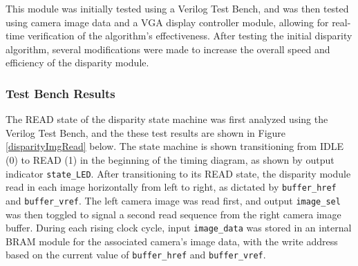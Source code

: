 \par
This module was initially tested using a Verilog Test Bench, and was then tested using camera image data and a VGA display controller module, allowing for real-time verification of the algorithm's effectiveness. After testing the initial disparity algorithm, several modifications were made to increase the overall speed and efficiency of the disparity module. 
\subsubsection{Test Bench Results}
The READ state of the disparity state machine was first analyzed using the Verilog Test Bench, and the these test results are shown in Figure \ref{disparityImgRead} below. The state machine is shown transitioning from IDLE (0) to READ (1) in the beginning of the timing diagram, as shown by output indicator \texttt{state\_LED}. After transitioning to its READ state, the disparity module read in each image horizontally from left to right, as dictated by \texttt{buffer\_href} and \texttt{buffer\_vref}. The left camera image was read first, and output \texttt{image\_sel} was then toggled to signal a second read sequence from the right camera image buffer. During each rising clock cycle, input \texttt{image\_data} was stored in an internal BRAM module for the associated camera's image data, with the write address based on the current value of \texttt{buffer\_href} and \texttt{buffer\_vref}. 

